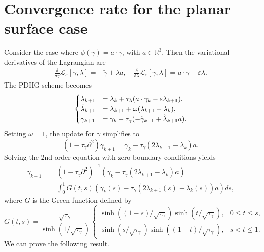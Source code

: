 \documentclass[12pt]{amsart}
\newcommand{\R}{\mathbb{R}}
\theoremstyle{definition}
\theoremstyle{remark}
\numberwithin{equation}{section}
\numberwithin{equation}{section}
\begin{document}
\section{{Convergence rate for the planar surface case}}\label{sec5}
Consider the case where $\phi(\gamma) = a\cdot \gamma$, with $a\in \R^3$. Then the variational derivatives of the Lagrangian are
\begin{align*}
    \frac{\delta}{\delta\gamma}\mathcal{L}_{\varepsilon}[\gamma, \lambda] = -\ddot{\gamma} + \lambda a, \quad 
    \frac{\delta}{\delta\lambda}\mathcal{L}_{\varepsilon}[\gamma, \lambda]   = a\cdot \gamma - \varepsilon\lambda.
\end{align*}
The PDHG scheme becomes 
\[\begin{cases}
    \lambda_{k+1} & = \lambda_k + \tau_{\lambda}(a\cdot\gamma_k - \varepsilon\lambda_{k+1}), \\
    \Tilde{\lambda}_{k+1} & = \lambda_{k+1} + \omega(\lambda_{k+1}- \lambda_k), \\
     \gamma_{k+1} & = \gamma_k -\tau_{\gamma}(-\ddot{\gamma}_{k+1}+ \Tilde{\lambda}_{k+1}a).
\end{cases}\]
Setting $\omega = 1$, the update for $\gamma$ simplifies to 
\[(1-\tau_{\gamma}\partial^2)\gamma_{k+1} = \gamma_k - \tau_{\gamma}(2\lambda_{k+1}-\lambda_k)a.\]
Solving the 2nd order equation with zero boundary conditions yields
\begin{align*}
\gamma_{k+1} &= (1-\tau_{\gamma}\partial^2)^{-1}(\gamma_k - \tau_{\gamma}(2\lambda_{k+1}-\lambda_k)a)\\
& =\int_0^1 G(t, s)\left( \gamma_k(s) - \tau_{\gamma}(2\lambda_{k+1}(s)-\lambda_k(s) )a\right)ds,
\end{align*}
where $G$ is the Green function defined by 
\[
G(t,s) = \frac{\sqrt{\tau_\gamma}}{\sinh (1/\sqrt{\tau_\gamma})} 
\begin{cases}
\sinh((1 - s)/\sqrt{\tau_\gamma}) \sinh(t/\sqrt{\tau_\gamma}), & 0 \leq t \leq s, \\
\sinh(s/\sqrt{\tau_\gamma}) \sinh((1 - t)/\sqrt{\tau_\gamma}), & s < t \leq 1.
\end{cases}
\]
We can prove the following result.
\end{document}
